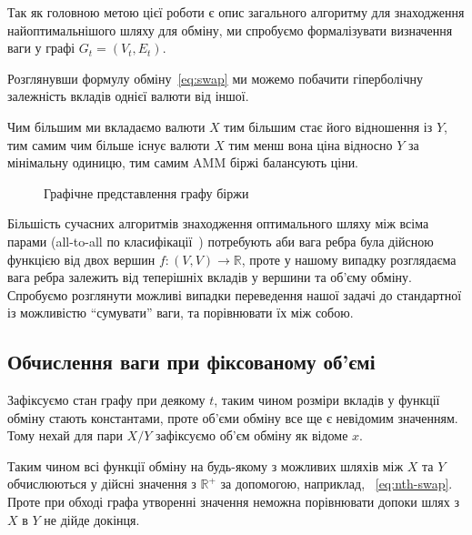\documentclass[../index.tex]{subfiles}
\begin{document}
Так як головною метою цієї роботи є опис загального алгоритму для знаходження
найоптимальнішого шляху для обміну, ми спробуємо формалізувати визначення ваги у
графі \(G_{t} = (V_{t}, E_{t})\).

Розглянувши формулу обміну~\eqref{eq:swap} ми можемо побачити гіперболічну
залежність вкладів однієї валюти від іншої.

Чим більшим ми вкладаємо валюти \(X\) тим більшим стає його відношення із \(Y\),
тим самим чим більше існує валюти \(X\) тим менш вона ціна відносно \(Y\) за
мінімальну одиницю, тим самим AMM біржі балансують ціни.

\begin{figure}[h]
	\centering
	\caption{Графічне представлення графу біржи}\label{fig:amm-graph}
\end{figure}

Більшість сучасних алгоритмів знаходження оптимального шляху між всіма парами
(all-to-all по класифікації~\cite{deo1980shortest}) потребують аби вага ребра
була дійсною функцією від двох вершин $f: (V, V) \to \mathbb{R}$, проте у нашому випадку
розглядаєма вага ребра залежить від теперішніх вкладів у вершини та об'єму
обміну. Спробуємо розглянути можливі випадки переведення нашої задачі до
стандартної із можливістю ``сумувати'' ваги, та порівнювати їх між собою.

\subsection{Обчислення ваги при фіксованому об'ємі}\label{sec:weight-non-fixed}

Зафіксуємо стан графу при деякому $t$, таким чином розміри вкладів у функції
обміну стають константами, проте об'єми обміну все ще є невідомим значенням.
Тому нехай для пари $X/Y$ зафіксуємо об'єм обміну як відоме $x$.

Таким чином всі функції обміну на будь-якому з можливих шляхів між $X$ та $Y$
обчислюються у дійсні значення з $\mathbb{R}^{+}$ за допомогою, наприклад,
~\eqref{eq:nth-swap}. Проте при обході графа утворенні значення неможна
порівнювати допоки шлях з $X$ в $Y$ не дійде докінця.
\end{document}
